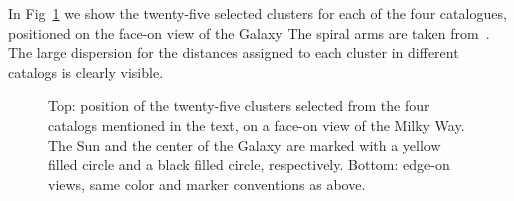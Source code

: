 \documentclass{aa}
\begin{document}



 In Fig~\ref{fig:MWmap} we show the twenty-five selected clusters for each of
 the four catalogues, positioned on the face-on view of the Galaxy The spiral
 arms are taken from~\cite{Momany_2006}. The large dispersion for the distances
 assigned to each cluster in different catalogs is clearly visible.

 \begin{figure}
  \caption{Top: position of the twenty-five clusters selected from the four
  catalogs mentioned in the text, on a face-on view of the Milky Way. The Sun
  and the center of the Galaxy are marked with a yellow filled circle and a
  black filled circle, respectively. Bottom: edge-on views, same color and
  marker conventions as above.}
  \label{fig:MWmap}
 \end{figure}
\end{document}
